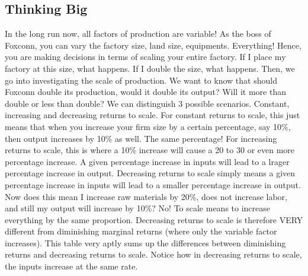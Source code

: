 \subsection{Thinking Big}
In the long run now, all factors of production are variable! As the boss of Foxconn, you can vary the factory size, land size, equipments. Everything! Hence, you are making decisions in terms of scaling your entire factory. If I place my factory at this size, what happens. If I double the size, what happens. Then, we go into investigating the scale of production. We want to know that should Foxconn double its production, would it double its output? Will it more than double or less than double? We can distinguish 3 possible scenarios. Constant, increasing and decreasing returns to scale. For constant returns to scale, this just means that when you increase your firm size by a certain percentage, say 10\%, then output increases by 10\% as well. The same percentage! For increasing returns to scale, this is where a 10\% increase will cause a 20 to 30 or even more percentage increase. A given percentage increase in inputs will lead to a lrager percentage increase in output. Decreasing returns to scale simply means a given percentage increase in inputs will lead to a smaller percentage increase in output. Now does this mean I increase raw materials by 20\%, does not increase labor, and still my output will increase by 10\%? No! To scale means to increase everything by the same proportion. Decreasing returns to scale is therefore VERY different from diminishing marginal returns (where only the variable factor increases). This table very aptly sums up the differences between diminishing returns and decreasing returns to scale. Notice how in decreasing returns to scale, the inputs increase at the same rate. 
